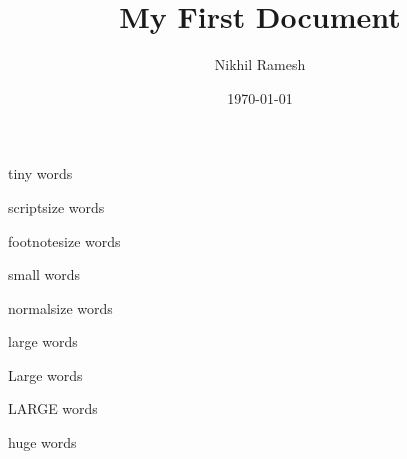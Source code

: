 \documentclass[a4paper,12pt]{article}
\begin{document}
\title{My First Document}
\author{Nikhil Ramesh}
\date{\today}
\maketitle
{\tiny tiny words}

{\scriptsize scriptsize words}

{\footnotesize footnotesize words}

{\small small words}

{\normalsize normalsize words}

{\large large words}

{\Large Large words}

{\LARGE LARGE words}

{\huge huge words}
\end{document}
